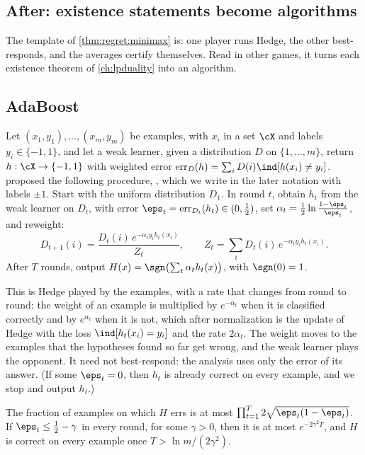 \begin{refsection}
\section{After: existence statements become algorithms}\label{sec:regret:algorithms}

The template of \cref{thm:regret:minimax} is: one player runs Hedge, the other best-responds, and the averages certify themselves. Read in other games, it turns each existence theorem of \cref{ch:lpduality} into an algorithm.

\subsection{AdaBoost}

Let $(x_1,y_1),\dots,(x_m,y_m)$ be examples, with $x_i$ in a set $\cX$ and labels $y_i\in\{-1,1\}$, and let a weak learner, given a distribution $D$ on $\{1,\dots,m\}$, return $h:\cX\to\{-1,1\}$ with weighted error $\rgerr_D(h)=\sum_iD(i)\ind[h(x_i)\ne y_i]$. \textcite{FreundSchapire1997} proposed the following procedure, , which we write in the later notation with labels $\pm1$. Start with the uniform distribution $D_1$. In round $t$, obtain $h_t$ from the weak learner on $D_t$, with error $\eps_t=\rgerr_{D_t}(h_t)\in(0,\frac12)$, set $\alpha_t=\frac12\ln\frac{1-\eps_t}{\eps_t}$, and reweight:
\[
D_{t+1}(i)=\frac{D_t(i)\,e^{-\alpha_ty_ih_t(x_i)}}{Z_t},\qquad Z_t=\sum_iD_t(i)\,e^{-\alpha_ty_ih_t(x_i)} .
\]
After $T$ rounds, output $H(x)=\sgn\bigl(\sum_t\alpha_th_t(x)\bigr)$, with $\sgn(0)=1$.

This is Hedge played by the examples, with a rate that changes from round to round: the weight of an example is multiplied by $e^{-\alpha_t}$ when it is classified correctly and by $e^{\alpha_t}$ when it is not, which after normalization is the update of Hedge with the loss $\ind[h_t(x_i)=y_i]$ and the rate $2\alpha_t$. The weight moves to the examples that the hypotheses found so far get wrong, and the weak learner plays the opponent. It need not best-respond: the analysis uses only the error of its answer. (If some $\eps_t=0$, then $h_t$ is already correct on every example, and we stop and output $h_t$.)

\begin{theorem}\label{thm:regret:adaboost}
The fraction of examples on which $H$ errs is at most $\prod_{t=1}^T2\sqrt{\eps_t(1-\eps_t)}$. If $\eps_t\le\frac12-\gamma$ in every round, for some $\gamma>0$, then it is at most $e^{-2\gamma^2T}$, and $H$ is correct on every example once $T>\ln m/(2\gamma^2)$.
\end{theorem}


\end{refsection}
